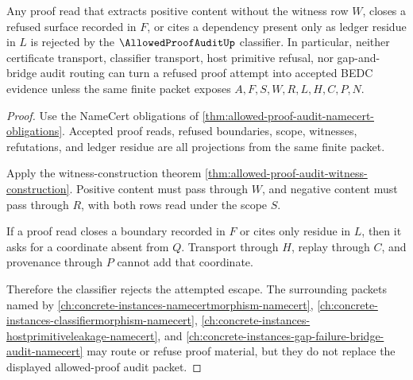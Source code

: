 \begin{theorem}
\label{thm:allowed-proof-audit-nonescape}
Any proof read that extracts positive content without the witness row $W$, closes a refused surface recorded in $F$, or cites a dependency present only as ledger residue in $L$ is rejected by the $\AllowedProofAuditUp$ classifier. In particular, neither certificate transport, classifier transport, host primitive refusal, nor gap-and-bridge audit routing can turn a refused proof attempt into accepted BEDC evidence unless the same finite packet exposes $A,F,S,W,R,L,H,C,P,N$.
\end{theorem}
\begin{proof}
Use the NameCert obligations of \autoref{thm:allowed-proof-audit-namecert-obligations}. Accepted proof reads, refused boundaries, scope, witnesses, refutations, and ledger residue are all projections from the same finite packet.

Apply the witness-construction theorem \autoref{thm:allowed-proof-audit-witness-construction}. Positive content must pass through $W$, and negative content must pass through $R$, with both rows read under the scope $S$.

If a proof read closes a boundary recorded in $F$ or cites only residue in $L$, then it asks for a coordinate absent from $Q$. Transport through $H$, replay through $C$, and provenance through $P$ cannot add that coordinate.

Therefore the classifier rejects the attempted escape. The surrounding packets named by \autoref{ch:concrete-instances-namecertmorphism-namecert}, \autoref{ch:concrete-instances-classifiermorphism-namecert}, \autoref{ch:concrete-instances-hostprimitiveleakage-namecert}, and \autoref{ch:concrete-instances-gap-failure-bridge-audit-namecert} may route or refuse proof material, but they do not replace the displayed allowed-proof audit packet.
\end{proof}



